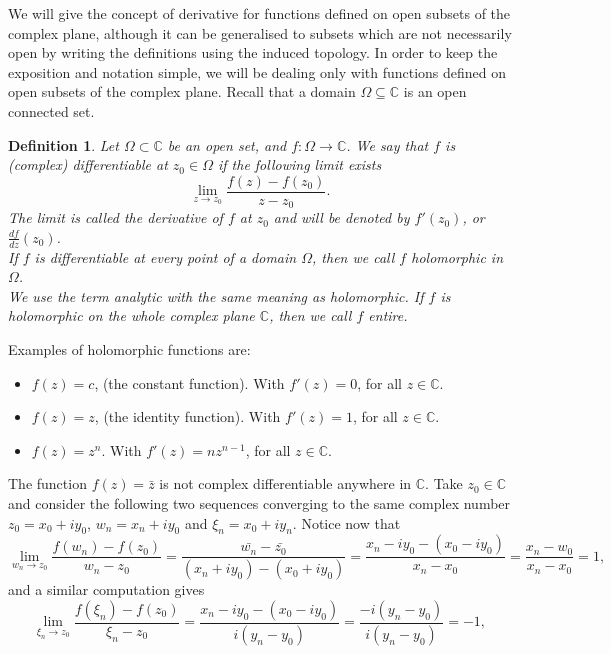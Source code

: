 \documentclass{amsart}
\newtheorem{mydef}{Definition}
\begin{document}
We will give the concept of derivative for functions defined on open subsets of the complex plane, although it can be generalised to subsets which are not necessarily open by writing the definitions using the induced topology. In order to keep the exposition and notation simple, we will be dealing only with functions defined on  open subsets of the complex plane.
Recall that a \alert{domain} \(\Omega \subseteq \mathbb{C}\) is an open connected set.

\begin{mydef}
Let \(\Omega\subset \mathbb{C}\) be an open set, and  \(f:\Omega \to \mathbb{C}\). We say that \(f\) is (complex) differentiable at \(z_0\in \Omega\) if the following limit exists
\[ \lim_{z\to z_0}\frac{f(z)- f(z_0)}{z - z_0}. \]
The limit is called the derivative of \(f\) at \(z_0\) and will be denoted by \(f'(z_0)\), or \(\frac{df}{dz}(z_0)\).\\
If \(f\) is differentiable at every point of a domain \(\Omega\), then we call \(f\) \alert{holomorphic} in \(\Omega\).\\
We use the term \alert{analytic} with the same meaning as holomorphic.
If \(f\) is holomorphic on the whole complex plane \(\mathbb{C}\), then we call \(f\) \alert{entire}.
\end{mydef}


Examples of holomorphic functions are:
\begin{itemize}
\item \(f(z) = c\), (the constant function). With \(f'(z) = 0\), for all \(z\in \mathbb{C}\).
\item \(f(z) = z\), (the identity function). With \(f'(z) = 1\), for all \(z\in \mathbb{C}\).
\item \(f(z) = z^n\). With \(f'(z) = nz^{n-1}\), for all \(z\in \mathbb{C}\).
\end{itemize}

The function \(f(z) = \bar{z}\) is not complex differentiable anywhere in \(\mathbb{C}\). Take \(z_0\in \mathbb{C}\) and consider the following two sequences converging to the same complex number \(z_0 = x_0 + iy_0\), \(w_n = x_n + iy_0\) and \(\xi_n = x_0 + i y_n\). Notice now that
\[ \lim_{w_n\to z_0} \frac{f(w_n) - f(z_0)}{w_n - z_0} = \frac{\bar{w_n} - \bar{z_0}}{(x_n + iy_0) - (x_0 + iy_0)} = \frac{x_n - iy_0 - (x_0 - iy_0)}{x_n - x_0} = \frac{x_n - w_0}{x_n - x_0} = 1, \]
and a similar computation gives
\[ \lim_{\xi_n\to z_0} \frac{f(\xi_n) - f(z_0)}{\xi_n - z_0} = \frac{x_n - iy_0 - (x_0 - iy_0)}{i(y_n - y_0)} = \frac{- i(y_n - y_0)}{i(y_n - y_0)} = -1, \]
\end{document}
